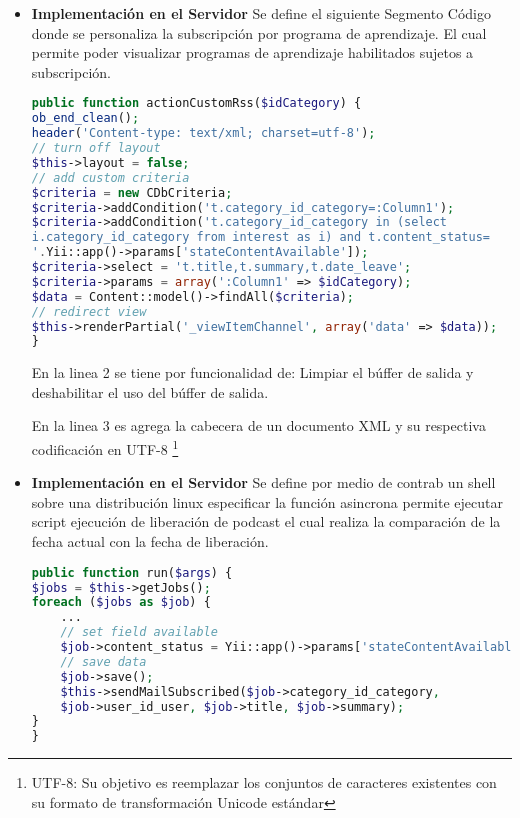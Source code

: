 \begin{itemize}

\item \textbf{Implementaci\'{o}n en el Servidor} Se define el siguiente Segmento
C\'{o}digo donde se personaliza la subscripci\'{o}n por programa de aprendizaje.
El cual permite poder visualizar programas de aprendizaje habilitados sujetos a
subscripci\'{o}n.

\begin{lstlisting}[language = PHP]
public function actionCustomRss($idCategory) {
ob_end_clean();
header('Content-type: text/xml; charset=utf-8');
// turn off layout
$this->layout = false;
// add custom criteria
$criteria = new CDbCriteria;
$criteria->addCondition('t.category_id_category=:Column1');
$criteria->addCondition('t.category_id_category in (select 
i.category_id_category from interest as i) and t.content_status=
'.Yii::app()->params['stateContentAvailable']);
$criteria->select = 't.title,t.summary,t.date_leave';
$criteria->params = array(':Column1' => $idCategory);
$data = Content::model()->findAll($criteria);
// redirect view
$this->renderPartial('_viewItemChannel', array('data' => $data));
}
\end{lstlisting}

En la linea 2 se tiene por funcionalidad de: Limpiar el b\'{u}ffer de
salida y deshabilitar el uso del b\'{u}ffer de salida.

En la linea 3 es agrega la cabecera de un documento XML y su respectiva
codificaci\'{o}n en UTF-8 \footnote{UTF-8: Su objetivo es reemplazar los conjuntos
de caracteres existentes con su formato de transformaci\'{o}n Unicode est\'{a}ndar}

\item \textbf{Implementaci\'{o}n en el Servidor} Se define por medio de contrab
un shell sobre una distribuci\'{o}n linux especificar la funci\'{o}n asincrona
permite ejecutar script ejecuci\'{o}n de liberaci\'{o}n de podcast el cual 
realiza la comparaci\'{o}n de la fecha actual con la fecha de liberaci\'{o}n.

\begin{lstlisting}[language = PHP]
public function run($args) {	
$jobs = $this->getJobs();
foreach ($jobs as $job) {
	...
    // set field available
    $job->content_status = Yii::app()->params['stateContentAvailable'];
    // save data
    $job->save();
    $this->sendMailSubscribed($job->category_id_category, 
    $job->user_id_user, $job->title, $job->summary);
}
}
\end{lstlisting}

\end{itemize}

